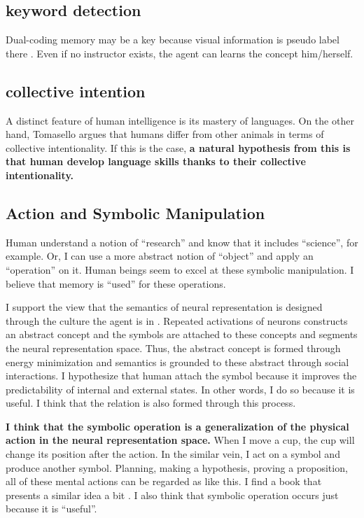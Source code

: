 \documentclass[12pt]{article}
\begin{document}
\subsection{keyword detection}
Dual-coding memory may be a key because visual information is pseudo label there \cite{Hill21}.
Even if no instructor exists, the agent can learns the concept him/herself.

\subsection{collective intention}
A distinct feature of human intelligence is its mastery of languages. On the other hand, 
Tomasello argues that humans differ from other animals in terms of collective intentionality.
If this is the case, \textbf{a natural hypothesis from this is that human develop language skills 
thanks to their collective intentionality.}

\subsection{Action and Symbolic Manipulation}
Human understand a notion of ``research'' and know that it includes ``science'', for example. 
Or, I can use a more abstract notion of ``object'' and apply an ``operation'' on it. Human beings 
seem to excel at these symbolic manipulation. I believe that memory is ``used'' for these operations. 

I support the view that the semantics of neural representation is designed through the culture 
the agent is in \cite{Santoro21}. Repeated activations of neurons constructs an abstract concept 
and the symbols are attached to these concepts and segments the neural representation space. 
Thus, the abstract concept is formed through energy minimization and semantics is grounded to these 
abstract through social interactions. I hypothesize that human attach the symbol because it 
improves the predictability of internal and external states. In other words, I do so 
because it is useful. I think that the relation is also formed through this process.

\textbf{I think that the symbolic operation is a generalization 
of the physical action in the neural representation space.} When I move a cup, the cup will change 
its position after the action. In the similar vein, I act on a symbol and produce another symbol. 
Planning, making a hypothesis, proving a proposition, all of these mental actions can be 
regarded as like this. I find a book that presents a similar idea a bit \cite{Hawkins21}. 
I also think that symbolic operation occurs just because it is ``useful''.
\end{document}
